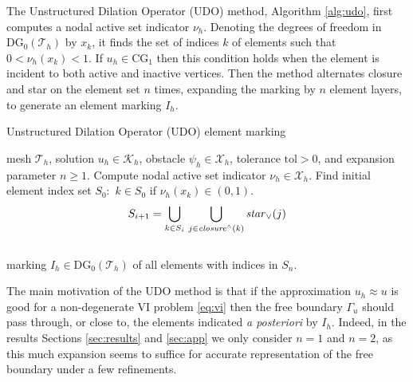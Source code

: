 \documentclass[]{interact}
\theoremstyle{plain}%
\theoremstyle{definition}
\theoremstyle{remark}
\newcommand{\cK}{\mathcal{K}}
\newcommand{\cT}{\mathcal{T}}
\newcommand{\cX}{\mathcal{X}}
\newcommand{\CG}{\text{CG}}
\newcommand{\DG}{\text{DG}}
\begin{document}
The Unstructured Dilation Operator (UDO) method, Algorithm \ref{alg:udo}, first computes a nodal active set indicator $\nu_h$.  Denoting the degrees of freedom in $\DG_0(\cT_h)$ by $x_k$, it finds the set of indices $k$ of elements such that $0<\nu_h(x_k)<1$.  If $u_h \in \CG_1$ then this condition holds when the element is incident to both active and inactive vertices.  Then the method alternates closure and star on the element set $n$ times, expanding the marking by $n$ element layers, to generate an element marking $I_h$.

\begin{algorithm}[ht]
	\caption{Unstructured Dilation Operator (UDO) element marking}
	\begin{algorithmic}[1]
		\Require mesh $\cT_h$, solution $u_h \in \cK_h$, obstacle $\psi_h \in \cX_h$, tolerance $\text{tol} > 0$, and expansion parameter $n\ge 1$.
		\State Compute nodal active set indicator $\nu_h \in \cX_h$.
		\State Find initial element index set $S_0$: \,$k\in S_0$ if $\nu_h(x_k) \in (0,1)$.
		    $$S_{i+1} = \bigcup_{k\in S_i}\, \bigcup_{j\in \text{\emph{closure}}^\wedge(k)} \text{\emph{star}}_\vee(j)$$
		\EndFor \\
		\Return marking $I_h \in \DG_0(\cT_h)$ of all elements with indices in $S_n$.
	\end{algorithmic}
\label{alg:udo}
\end{algorithm}

The main motivation of the UDO method is that if the approximation $u_h\approx u$ is good for a non-degenerate VI problem \eqref{eq:vi} then the free boundary $\Gamma_u$ should pass through, or close to, the elements indicated \emph{a posteriori} by $I_h$.  Indeed, in the results Sections \ref{sec:results} and \ref{sec:app} we only consider $n=1$ and $n=2$, as this much expansion seems to suffice for accurate representation of the free boundary under a few refinements.
\end{document}
